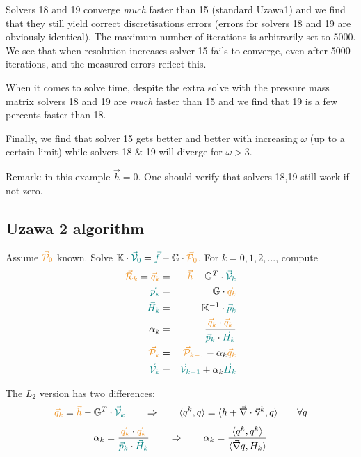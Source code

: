 Solvers 18 and 19 converge {\it much} faster than 15 (standard Uzawa1) and we find that 
they still yield correct discretisations errors (errors for solvers 18 and 19
are obviously identical).
The maximum number of iterations is arbitrarily set to 5000. We see that when resolution increases 
solver 15 fails to converge, even after 5000 iterations, and the measured errors reflect this.

When it comes to solve time, despite the extra solve with the 
pressure mass matrix solvers 18 and 19 are {\it much} faster than 15
and we find that 19 is a few percents faster than 18. 

Finally, we find that solver 15 gets better and better with increasing $\omega$
(up to a certain limit) while solvers 18 \& 19 will diverge for $\omega>3$.

Remark: in this example $\vec{h}=0$. One should verify that solvers 18,19 still work if not zero.

\subsection*{Uzawa 2 algorithm}

Assume ${\color{carrotorange} \vec{\cal P}_0}$ known. 
Solve $\mathbb{K}\cdot {\color{teal} \vec{\cal V}_0} 
= {\color{teal} \vec{f}} - \mathbb{G}\cdot  {\color{carrotorange} \vec{\cal P}_0}$. 
For $k=0,1,2,...$, compute 
\begin{eqnarray}
{\color{carrotorange} \vec{\cal R}_k}
={\color{carrotorange} \vec{q}_k} 
&=& {\color{carrotorange} \vec{h}} - \mathbb{G}^T \cdot {\color{teal} \vec{\cal V}_k}  \nn\\
{\color{teal} \vec{p}_k} &=& {\G}\cdot {\color{carrotorange} \vec{q}_k} \nn\\
{\color{teal} \vec{H}_k} &=& {\K}^{-1}\cdot {\color{teal} \vec{p}_k } \nn\\
\alpha_k &=& \frac{  {\color{carrotorange} \vec{q}_k} \cdot {\color{carrotorange} \vec{q}_k}}
{ {\color{teal} \vec{p}_k} \cdot {\color{teal} \vec{H}_k }} \nn\\
{\color{carrotorange} \vec {\cal P}_k} &=& 
{\color{carrotorange} \vec {\cal P}_{k-1}} - \alpha_k  {\color{carrotorange} \vec q_k} \nn\\
{\color{teal} \vec {\cal V}_{k}} &=& {\color{teal} \vec {\cal V}_{k-1}} 
+ \alpha_k {\color{teal} \vec{H}_k}
\end{eqnarray}

The $L_2$ version has two differences:
\[
{\color{carrotorange} \vec{q}_k} = 
{\color{carrotorange} \vec{h}} - \mathbb{G}^T \cdot {\color{teal} \vec{\cal V}_k} 
\qquad
\Rightarrow
\qquad
\langle q^k,q \rangle  = \langle h+ \vec\nabla \cdot \vec\upnu^k,q \rangle \qquad \forall q
\]
\[
\alpha_k = \frac{  {\color{carrotorange} \vec{q}_k} \cdot {\color{carrotorange} \vec{q}_k}}
{ {\color{teal} \vec{p}_k} \cdot {\color{teal} \vec{H}_k }} 
\qquad
\Rightarrow
\qquad
\alpha_k = \frac{ \langle q^k,q^k  \rangle  }{ \langle \vec\nabla q , H_k  \rangle   }
\]




